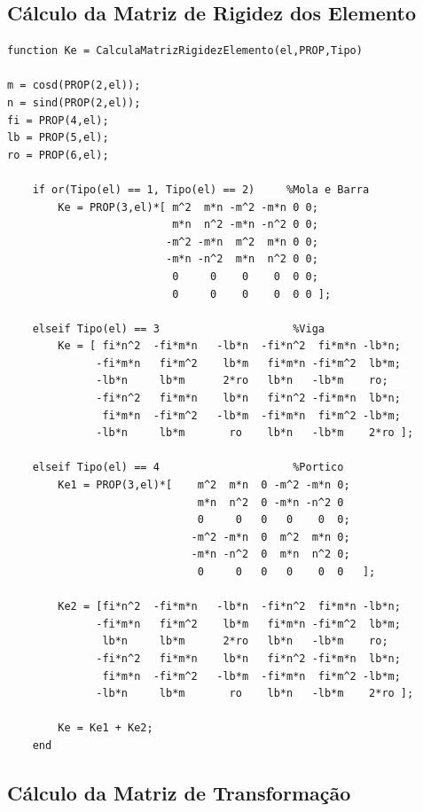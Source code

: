 \documentclass[deposito, acronym, symbols]{fei}
\begin{document}
\subsection{Cálculo da Matriz de Rigidez dos Elemento}

\begin{lstlisting}
function Ke = CalculaMatrizRigidezElemento(el,PROP,Tipo)

m = cosd(PROP(2,el));
n = sind(PROP(2,el));
fi = PROP(4,el);
lb = PROP(5,el);
ro = PROP(6,el);

    if or(Tipo(el) == 1, Tipo(el) == 2)     %Mola e Barra 
        Ke = PROP(3,el)*[ m^2  m*n -m^2 -m*n 0 0;
                          m*n  n^2 -m*n -n^2 0 0;
                         -m^2 -m*n  m^2  m*n 0 0;
                         -m*n -n^2  m*n  n^2 0 0;
                          0     0    0    0  0 0;
                          0     0    0    0  0 0 ];
        
    elseif Tipo(el) == 3                     %Viga 
        Ke = [ fi*n^2  -fi*m*n   -lb*n  -fi*n^2  fi*m*n -lb*n;
              -fi*m*n   fi*m^2    lb*m   fi*m*n -fi*m^2  lb*m;
              -lb*n     lb*m      2*ro   lb*n   -lb*m    ro;
              -fi*n^2   fi*m*n    lb*n   fi*n^2 -fi*m*n  lb*n;
               fi*m*n  -fi*m^2   -lb*m  -fi*m*n  fi*m^2 -lb*m;
              -lb*n     lb*m       ro    lb*n   -lb*m    2*ro ];

    elseif Tipo(el) == 4                     %Portico
        Ke1 = PROP(3,el)*[    m^2  m*n  0 -m^2 -m*n 0;
                              m*n  n^2  0 -m*n -n^2 0
                              0     0   0   0    0  0;
                             -m^2 -m*n  0  m^2  m*n 0;
                             -m*n -n^2  0  m*n  n^2 0;
                              0     0   0   0    0  0   ];

        Ke2 = [fi*n^2  -fi*m*n   -lb*n  -fi*n^2  fi*m*n -lb*n;
              -fi*m*n   fi*m^2    lb*m   fi*m*n -fi*m^2  lb*m;
               lb*n     lb*m      2*ro   lb*n   -lb*m    ro;
              -fi*n^2   fi*m*n    lb*n   fi*n^2 -fi*m*n  lb*n;
               fi*m*n  -fi*m^2   -lb*m  -fi*m*n  fi*m^2 -lb*m;
              -lb*n     lb*m       ro    lb*n   -lb*m    2*ro ];

        Ke = Ke1 + Ke2;
    end

\end{lstlisting}


\subsection{Cálculo da Matriz de Transformação}
\end{document}
